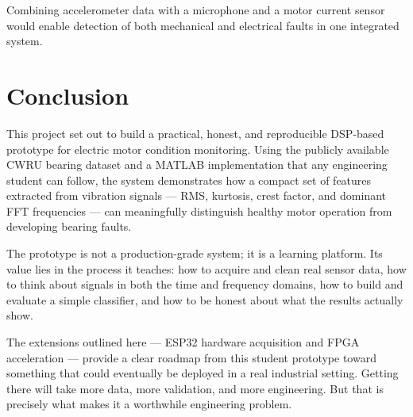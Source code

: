 \documentclass[12pt,a4paper]{article}
\begin{document}
Combining accelerometer data with a microphone and a motor current
sensor would enable detection of both mechanical and electrical
faults in one integrated system.

\section{Conclusion}

This project set out to build a practical, honest, and reproducible
DSP-based prototype for electric motor condition monitoring. Using
the publicly available CWRU bearing dataset and a MATLAB
implementation that any engineering student can follow, the system
demonstrates how a compact set of features extracted from vibration
signals --- RMS, kurtosis, crest factor, and dominant FFT
frequencies --- can meaningfully distinguish healthy motor
operation from developing bearing faults.

The prototype is not a production-grade system; it is a learning
platform. Its value lies in the process it teaches: how to acquire
and clean real sensor data, how to think about signals in both the
time and frequency domains, how to build and evaluate a simple
classifier, and how to be honest about what the results actually
show.

The extensions outlined here --- ESP32 hardware acquisition and
FPGA acceleration --- provide a clear roadmap from this student
prototype toward something that could eventually be deployed in a
real industrial setting. Getting there will take more data, more
validation, and more engineering. But that is precisely what makes
it a worthwhile engineering problem.



\end{document}
